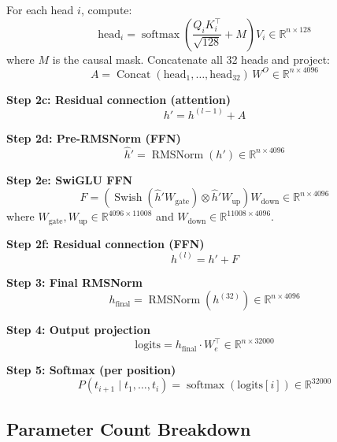 \documentclass[11pt,a4paper]{article}
\newcommand{\R}{\mathbb{R}}
\newcommand{\softmax}{\operatorname{softmax}}
\newcommand{\RMSNorm}{\operatorname{RMSNorm}}
\newcommand{\Swish}{\operatorname{Swish}}
\newcommand{\Concat}{\operatorname{Concat}}
\begin{document}
For each head $i$, compute:
\begin{equation}
  \text{head}_i = \softmax\!\left(\frac{Q_i K_i^\top}{\sqrt{128}} + M\right) V_i
  \in \R^{n \times 128}
\end{equation}
where $M$ is the causal mask. Concatenate all 32 heads and project:
\begin{equation}
  A = \Concat(\text{head}_1, \ldots, \text{head}_{32}) \, W^O \in \R^{n \times 4096}
\end{equation}

\noindent\textbf{Step 2c: Residual connection (attention)}
\begin{equation}
  h' = h^{(l-1)} + A
\end{equation}

\noindent\textbf{Step 2d: Pre-RMSNorm (FFN)}
\begin{equation}
  \hat{h}' = \RMSNorm(h') \in \R^{n \times 4096}
\end{equation}

\noindent\textbf{Step 2e: SwiGLU FFN}
\begin{equation}
  F = \left(\Swish(\hat{h}' W_{\text{gate}}) \otimes \hat{h}' W_{\text{up}}\right) W_{\text{down}}
  \in \R^{n \times 4096}
\end{equation}
where $W_{\text{gate}}, W_{\text{up}} \in \R^{4096 \times 11008}$ and
$W_{\text{down}} \in \R^{11008 \times 4096}$.

\noindent\textbf{Step 2f: Residual connection (FFN)}
\begin{equation}
  h^{(l)} = h' + F
\end{equation}

\medskip

\noindent\textbf{Step 3: Final RMSNorm}
\begin{equation}
  h_{\text{final}} = \RMSNorm(h^{(32)}) \in \R^{n \times 4096}
\end{equation}

\noindent\textbf{Step 4: Output projection}
\begin{equation}
  \text{logits} = h_{\text{final}} \cdot W_e^\top \in \R^{n \times 32000}
\end{equation}

\noindent\textbf{Step 5: Softmax (per position)}
\begin{equation}
  P(t_{i+1} \mid t_1, \ldots, t_i) = \softmax(\text{logits}[i]) \in \R^{32000}
\end{equation}

\subsection{Parameter Count Breakdown}
\end{document}
